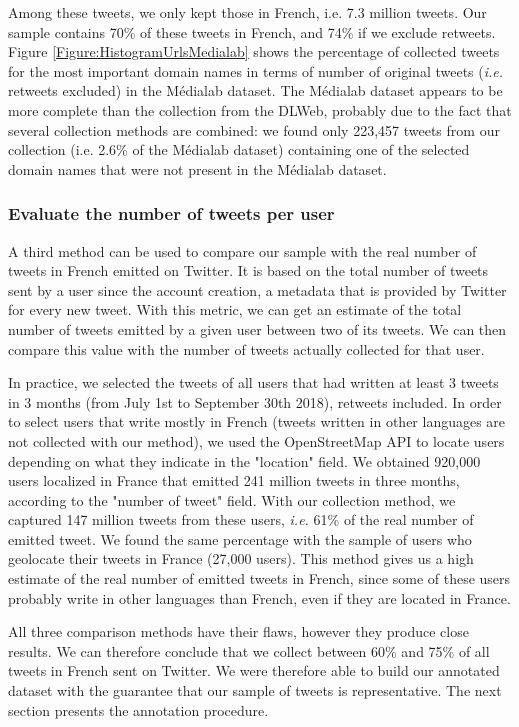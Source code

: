 Among these tweets, we only kept those in French, i.e. 7.3 million tweets. Our sample contains 70\% of these tweets in French, and 74\% if we exclude retweets. Figure \ref{Figure:HistogramUrlsMedialab} shows the percentage of collected tweets for the most important domain names in terms of number of original tweets (\textit{i.e.} retweets excluded) in the Médialab dataset. The Médialab dataset appears to be more complete than the collection from the DLWeb, probably due to the fact that several collection methods are combined: we found only 223,457 tweets from our collection (i.e. 2.6\% of the Médialab dataset) containing one of the selected domain names that were not present in the Médialab dataset.

\subsubsection{Evaluate the number of tweets per user}

A third method can be used to compare our sample with the real number of tweets in French emitted on Twitter. It is based on the total number of tweets sent by a user since the account creation, a metadata that is provided by Twitter for every new tweet. With this metric, we can get an estimate of the total number of tweets emitted by a given user between two of its tweets. We can then compare this value with the number of tweets actually collected for that user.

In practice, we selected the tweets of all users that had written at least 3 tweets in 3 months (from July 1st to September 30th 2018), retweets included. In order to select users that write mostly in French (tweets written in other languages are not collected with our method), we used the OpenStreetMap API to locate users depending on what they indicate in the "location" field. We obtained 920,000 users localized in France that emitted 241 million tweets in three months, according to the "number of tweet" field. With our collection method, we captured 147 million tweets from these users, \textit{i.e.} 61\% of the real number of emitted tweet. We found the same percentage with the sample of users who geolocate their tweets in France (27,000 users). This method gives us a high estimate of the real number of emitted tweets in French, since some of these users probably write in other languages than French, even if they are located in France.

All three comparison methods have their flaws, however they produce close results.
We can therefore conclude that we collect between 60\% and 75\% of all tweets in French sent on Twitter.
We were therefore able to build our annotated dataset with the guarantee that our sample of tweets is representative.
The next section presents the annotation procedure.


